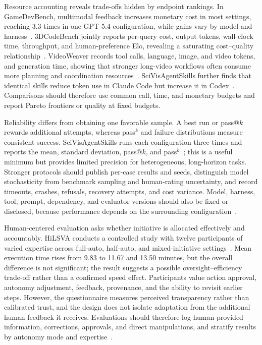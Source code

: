 Resource accounting reveals trade-offs hidden by endpoint rankings. In GameDevBench, multimodal feedback increases monetary cost in most settings, reaching 3.3 times in one GPT-5.4 configuration, while gains vary by model and harness~\cite{avg260211103}. 3DCodeBench jointly reports per-query cost, output tokens, wall-clock time, throughput, and human-preference Elo, revealing a saturating cost--quality relationship~\cite{avg260601057}. VideoWeaver records tool calls, language, image, and video tokens, and generation time, showing that stronger long-video workflows often consume more planning and coordination resources~\cite{avg260608091}. SciVisAgentSkills further finds that identical skills reduce token use in Claude Code but increase it in Codex~\cite{avg260605525}. Comparisons should therefore use common call, time, and monetary budgets and report Pareto frontiers or quality at fixed budgets.

Reliability differs from obtaining one favorable sample. A best run or pass@$k$ rewards additional attempts, whereas pass$^k$ and failure distributions measure consistent success. SciVisAgentSkills runs each configuration three times and reports the mean, standard deviation, pass@$k$, and pass$^k$~\cite{avg260605525}; this is a useful minimum but provides limited precision for heterogeneous, long-horizon tasks. Stronger protocols should publish per-case results and seeds, distinguish model stochasticity from benchmark sampling and human-rating uncertainty, and record timeouts, crashes, refusals, recovery attempts, and cost variance. Model, harness, tool, prompt, dependency, and evaluator versions should also be fixed or disclosed, because performance depends on the surrounding configuration~\cite{avg260608091}.

Human-centered evaluation asks whether initiative is allocated effectively and accountably. HiLSVA conducts a controlled study with twelve participants of varied expertise across full-auto, half-auto, and mixed-initiative settings~\cite{avg260626614}. Mean execution time rises from 9.83 to 11.67 and 13.50 minutes, but the overall difference is not significant; the result suggests a possible oversight--efficiency trade-off rather than a confirmed speed effect. Participants value action approval, autonomy adjustment, feedback, provenance, and the ability to revisit earlier steps. However, the questionnaire measures perceived transparency rather than calibrated trust, and the design does not isolate adaptation from the additional human feedback it receives. Evaluations should therefore log human-provided information, corrections, approvals, and direct manipulations, and stratify results by autonomy mode and expertise~\cite{avg260626614}.

